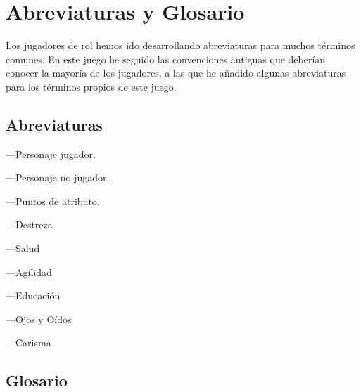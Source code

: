 \chapter{Abreviaturas y Glosario}

Los jugadores de rol hemos ido desarrollando abreviaturas para muchos términos comunes. En este juego he seguido las convenciones antiguas que deberían conocer la mayoría de los jugadores, a las que he añadido algunas abreviaturas para los términos propios de este juego.

\section{Abreviaturas}

\begin{description}
\small
\item[PJ] ---Personaje jugador.
\item[PNJ] ---Personaje no jugador.
\item[PA] ---Puntos de atributo.
\item[DES] ---Destreza
\item[SAL] ---Salud
\item[AGI] ---Agilidad
\item[EDU] ---Educación
\item[OYO] ---Ojos y Oídos
\item[CAR] ---Carisma
\end{description}

\section{Glosario}